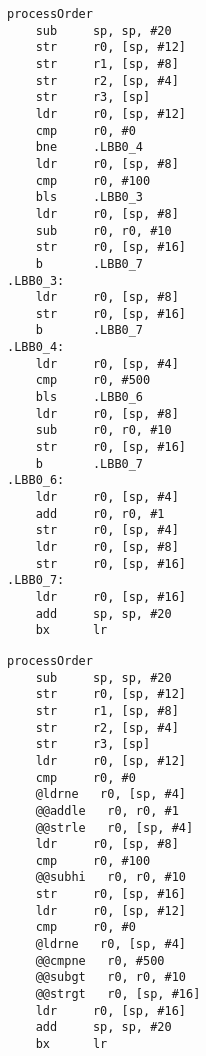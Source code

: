 \begin{minipage}{0.45\textwidth}
    \begin{lstlisting}[style=AsmStyle]
processOrder
    sub     sp, sp, #20
    str     r0, [sp, #12]
    str     r1, [sp, #8]
    str     r2, [sp, #4]
    str     r3, [sp]
    ldr     r0, [sp, #12]
    cmp     r0, #0
    bne     .LBB0_4
    ldr     r0, [sp, #8]
    cmp     r0, #100
    bls     .LBB0_3
    ldr     r0, [sp, #8]
    sub     r0, r0, #10
    str     r0, [sp, #16]
    b       .LBB0_7
.LBB0_3:
    ldr     r0, [sp, #8]
    str     r0, [sp, #16]
    b       .LBB0_7
.LBB0_4:
    ldr     r0, [sp, #4]
    cmp     r0, #500
    bls     .LBB0_6
    ldr     r0, [sp, #8]
    sub     r0, r0, #10
    str     r0, [sp, #16]
    b       .LBB0_7
.LBB0_6:
    ldr     r0, [sp, #4]
    add     r0, r0, #1
    str     r0, [sp, #4]
    ldr     r0, [sp, #8]
    str     r0, [sp, #16]
.LBB0_7:
    ldr     r0, [sp, #16]
    add     sp, sp, #20
    bx      lr
    \end{lstlisting}
\end{minipage}%
\hspace{1cm}
\begin{minipage}{0.45\textwidth}
    \begin{lstlisting}[style=AsmStyle, numbers=right, belowskip=14.5\baselineskip]
processOrder
    sub     sp, sp, #20
    str     r0, [sp, #12]
    str     r1, [sp, #8]
    str     r2, [sp, #4]
    str     r3, [sp]
    ldr     r0, [sp, #12]
    cmp     r0, #0
    @ldrne   r0, [sp, #4]
    @@addle   r0, r0, #1
    @@strle   r0, [sp, #4]
    ldr     r0, [sp, #8]
    cmp     r0, #100
    @@subhi   r0, r0, #10
    str     r0, [sp, #16]
    ldr     r0, [sp, #12]
    cmp     r0, #0
    @ldrne   r0, [sp, #4]
    @@cmpne   r0, #500
    @@subgt   r0, r0, #10
    @@strgt   r0, [sp, #16]
    ldr     r0, [sp, #16]
    add     sp, sp, #20
    bx      lr  
    \end{lstlisting}
\end{minipage}%